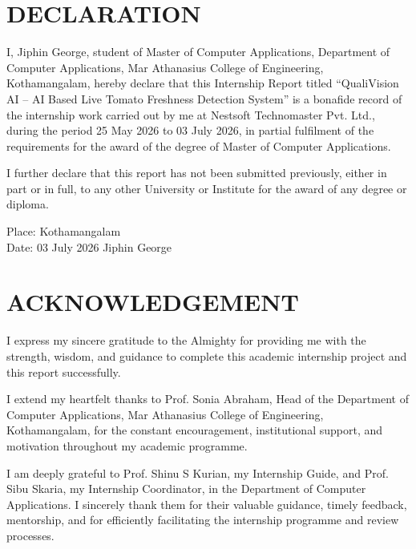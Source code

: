 \pagestyle{frontmatter}

\chapter*{DECLARATION}

I, Jiphin George, student of Master of Computer Applications, Department of Computer Applications, Mar Athanasius College of Engineering, Kothamangalam, hereby declare that this Internship Report titled ``QualiVision AI – AI Based Live Tomato Freshness Detection System'' is a bonafide record of the internship work carried out by me at Nestsoft Technomaster Pvt. Ltd., during the period 25 May 2026 to 03 July 2026, in partial fulfilment of the requirements for the award of the degree of Master of Computer Applications.

I further declare that this report has not been submitted previously, either in part or in full, to any other University or Institute for the award of any degree or diploma.

\vspace{1.5cm}

\noindent Place: Kothamangalam\\
\noindent Date: 03 July 2026 \hfill Jiphin George

\newpage

\chapter*{ACKNOWLEDGEMENT}

I express my sincere gratitude to the Almighty for providing me with the strength, wisdom, and guidance to complete this academic internship project and this report successfully.

I extend my heartfelt thanks to Prof. Sonia Abraham, Head of the Department of Computer Applications, Mar Athanasius College of Engineering, Kothamangalam, for the constant encouragement, institutional support, and motivation throughout my academic programme.

I am deeply grateful to Prof. Shinu S Kurian, my Internship Guide, and Prof. Sibu Skaria, my Internship Coordinator, in the Department of Computer Applications. I sincerely thank them for their valuable guidance, timely feedback, mentorship, and for efficiently facilitating the internship programme and review processes.

